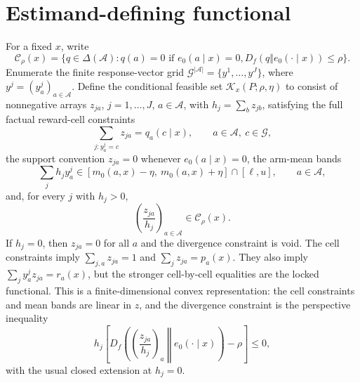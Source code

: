 \documentclass[11pt]{article}
\theoremstyle{definition}
\theoremstyle{plain}
\theoremstyle{remark}
\begin{document}
\section{Estimand-defining functional}
For a fixed $x$, write
\[
  \mathcal C_\rho(x)
  =\{q\in\Delta(\mathcal A):q(a)=0\text{ if }e_0(a\mid x)=0,
       D_f(q\Vert e_0(\cdot\mid x))\le \rho\}.
\]
Enumerate the finite response-vector grid
$\mathcal G^{|\mathcal A|}=\{y^1,\ldots,y^J\}$, where
$y^j=(y^j_a)_{a\in\mathcal A}$.  Define the conditional feasible set
$\mathcal K_x(P;\rho,\eta)$ to consist of nonnegative arrays
$z_{ja}$, $j=1,\ldots,J$, $a\in\mathcal A$, with
$h_j=\sum_b z_{jb}$, satisfying the full factual reward-cell constraints
\[
  \sum_{j:y^j_a=c} z_{ja}=q_a(c\mid x),
  \qquad a\in\mathcal A,\ c\in\mathcal G,
\]
the support convention $z_{ja}=0$ whenever $e_0(a\mid x)=0$, the arm-mean bands
\[
  \sum_j h_j y^j_a \in [m_0(a,x)-\eta,\ m_0(a,x)+\eta]\cap[\ell,u],
  \qquad a\in\mathcal A,
\]
and, for every $j$ with $h_j>0$,
\[
  \left(\frac{z_{ja}}{h_j}\right)_{a\in\mathcal A}\in\mathcal C_\rho(x).
\]
If $h_j=0$, then $z_{ja}=0$ for all $a$ and the divergence constraint is void.
The cell constraints imply $\sum_{j,a}z_{ja}=1$ and
$\sum_j z_{ja}=p_a(x)$.  They also imply
$\sum_j y^j_a z_{ja}=r_a(x)$, but the stronger cell-by-cell equalities are the
locked functional.  This is a finite-dimensional convex representation: the
cell constraints and mean bands are linear in $z$, and the divergence constraint
is the perspective inequality
\[
  h_j\!\left[
  D_f\!\left(\left(\frac{z_{ja}}{h_j}\right)_a
          \middle\Vert e_0(\cdot\mid x)\right)-\rho\right]\le 0,
\]
with the usual closed extension at $h_j=0$.
\end{document}
